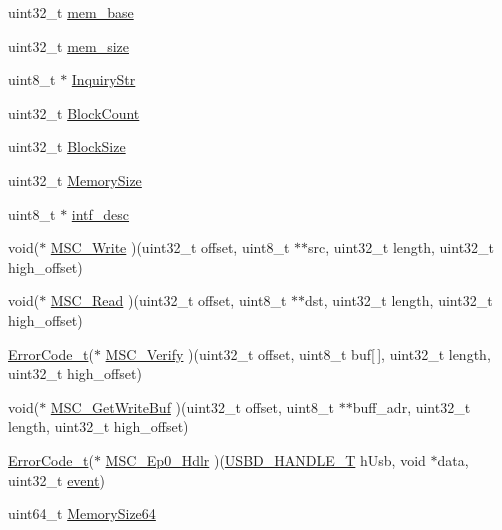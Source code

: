 \begin{DoxyCompactItemize}
\item 
uint32\+\_\+t \hyperlink{struct_u_s_b_d___m_s_c___i_n_i_t___p_a_r_a_m_a1ab6b66d44ad7db8c2ded5e2f4200aae}{mem\+\_\+base}
\item 
uint32\+\_\+t \hyperlink{struct_u_s_b_d___m_s_c___i_n_i_t___p_a_r_a_m_a33048544944f306ae198de18468309b4}{mem\+\_\+size}
\item 
uint8\+\_\+t $\ast$ \hyperlink{struct_u_s_b_d___m_s_c___i_n_i_t___p_a_r_a_m_a84e110f5e1d448f9c35e9e8583429df8}{Inquiry\+Str}
\item 
uint32\+\_\+t \hyperlink{struct_u_s_b_d___m_s_c___i_n_i_t___p_a_r_a_m_a88951ad7bc026318e18eadf372804caa}{Block\+Count}
\item 
uint32\+\_\+t \hyperlink{struct_u_s_b_d___m_s_c___i_n_i_t___p_a_r_a_m_af0ed8a5b4aec5f19e1b15c1ab3c3dcbd}{Block\+Size}
\item 
uint32\+\_\+t \hyperlink{struct_u_s_b_d___m_s_c___i_n_i_t___p_a_r_a_m_af5cecd156943a33ccaa619ea8a9d596d}{Memory\+Size}
\item 
uint8\+\_\+t $\ast$ \hyperlink{struct_u_s_b_d___m_s_c___i_n_i_t___p_a_r_a_m_a308fc23cd32876dcdc914d2223f8f7c4}{intf\+\_\+desc}
\item 
void($\ast$ \hyperlink{struct_u_s_b_d___m_s_c___i_n_i_t___p_a_r_a_m_a4f0ca241688cb8ccae080eb9e958cba3}{M\+S\+C\+\_\+\+Write} )(uint32\+\_\+t offset, uint8\+\_\+t $\ast$$\ast$src, uint32\+\_\+t length, uint32\+\_\+t high\+\_\+offset)
\item 
void($\ast$ \hyperlink{struct_u_s_b_d___m_s_c___i_n_i_t___p_a_r_a_m_a6695a1fe8a7201c91ff6dadace9b7ef7}{M\+S\+C\+\_\+\+Read} )(uint32\+\_\+t offset, uint8\+\_\+t $\ast$$\ast$dst, uint32\+\_\+t length, uint32\+\_\+t high\+\_\+offset)
\item 
\hyperlink{error_8h_a905255056c349318139d94aa4523d516}{Error\+Code\+\_\+t}($\ast$ \hyperlink{struct_u_s_b_d___m_s_c___i_n_i_t___p_a_r_a_m_a8d8010352b3183a3b29c509f1d76c03c}{M\+S\+C\+\_\+\+Verify} )(uint32\+\_\+t offset, uint8\+\_\+t buf\mbox{[}$\,$\mbox{]}, uint32\+\_\+t length, uint32\+\_\+t high\+\_\+offset)
\item 
void($\ast$ \hyperlink{struct_u_s_b_d___m_s_c___i_n_i_t___p_a_r_a_m_a6463d6a686009289cc1a92209f276514}{M\+S\+C\+\_\+\+Get\+Write\+Buf} )(uint32\+\_\+t offset, uint8\+\_\+t $\ast$$\ast$buff\+\_\+adr, uint32\+\_\+t length, uint32\+\_\+t high\+\_\+offset)
\item 
\hyperlink{error_8h_a905255056c349318139d94aa4523d516}{Error\+Code\+\_\+t}($\ast$ \hyperlink{struct_u_s_b_d___m_s_c___i_n_i_t___p_a_r_a_m_a9d79a4a1054e7ecb88c7a2b51aa3d4c8}{M\+S\+C\+\_\+\+Ep0\+\_\+\+Hdlr} )(\hyperlink{group___u_s_b_d___core_gafdbb2204d929cb9d75736bd2b42342ac}{U\+S\+B\+D\+\_\+\+H\+A\+N\+D\+L\+E\+\_\+T} h\+Usb, void $\ast$data, uint32\+\_\+t \hyperlink{structevent}{event})
\item 
uint64\+\_\+t \hyperlink{struct_u_s_b_d___m_s_c___i_n_i_t___p_a_r_a_m_abca96b7a6d9b77020bdca1ffdd153e56}{Memory\+Size64}
\end{DoxyCompactItemize}


